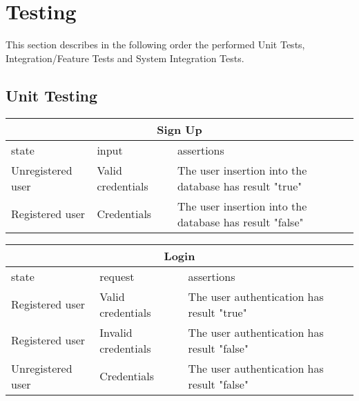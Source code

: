 \section{Testing}

This section describes in the following order the performed Unit Tests, Integration/Feature Tests and System Integration Tests.

\subsection{Unit Testing}

\begin{center}
	\begin{tabular}{|p{}|p{}|p{}|}
		\hline
		\multicolumn{3}{c}{Sign Up}\\
		\hline
		state & input & assertions \\
		\hline
		Unregistered user &
		Valid credentials& 
		The user insertion into the database has  result "true"\newline
		\\
		\hline
		Registered user &
		Credentials& 
		The user insertion into the database has result "false" \newline
		\\
		\hline
	\end{tabular}
\end{center}

\begin{center}
	\begin{tabular}{|p{}|p{}|p{}|}
		\hline
		\multicolumn{3}{c}{Login}\\
		
		\hline
		state & request & assertions \\
		
		\hline
		Registered user& 
		Valid credentials &
		The user authentication has result "true" \newline
		\\
		
		\hline
		Registered user & 
		Invalid credentials &
		The user authentication has result "false"  \newline
		\\
		
		\hline
		Unregistered user & 
		Credentials &
		The user authentication has result "false"  \newline
		\\
		\hline
		
	\end{tabular}
\end{center}

